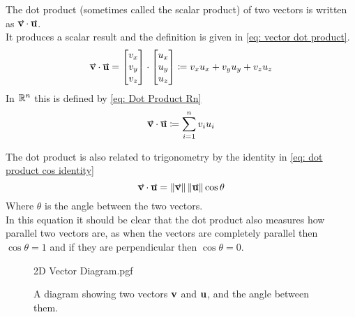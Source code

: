 \documentclass[main.tex]{subfiles}
\begin{document}
                The dot product (sometimes called the scalar product) of two vectors is written as $\vect{v} \cdot \vect{u}$.\\
                It produces a scalar result and the definition is given in \eqref{eq: vector dot product}.
                \begin{equation}
                    \vect{v} \cdot \vect{u} = \Matrix{v_x\\v_y\\v_z} \cdot \Matrix{u_x\\u_y\\u_z} \deq v_x u_x + v_y u_y + v_z u_z
                    \label{eq: vector dot product}
                \end{equation}
                In $\mathbb{R}^n$ this is defined by \eqref{eq: Dot Product Rn}
                \begin{equation}
                    \vect{v} \cdot \vect{u} \deq \sum_{i=1}^n v_i u_i
                    \label{eq: Dot Product Rn}
                \end{equation}

                The dot product is also related to trigonometry by the identity in \eqref{eq: dot product cos identity}
                \begin{equation}
                    \vect{v} \cdot \vect{u} = \vmod{\vect{v}} \vmod{\vect{u}} \cos\theta
                    \label{eq: dot product cos identity}
                \end{equation}
                Where $\theta$ is the angle between the two vectors.\\
                In this equation it should be clear that the dot product also measures how parallel two vectors are, as when the vectors are completely parallel then $\cos\theta = 1$ and if they are perpendicular then $\cos\theta = 0$.

                \begin{figure}[!h]
                    \centering
                    \scalebox{0.7}
                    {
                        \begin{adjustbox}{clip,trim=10mm 5mm 10mm 10mm}
                            {{2D Vector Diagram.pgf}}
                        \end{adjustbox}
                    }
                    \vspace{-8mm}
                    \caption{A diagram showing two vectors $\boldsymbol{\mathbf{v}}$ and $\boldsymbol{\mathbf{u}}$, and the angle between them.}
                    \label{fig: Dot Product Diagram}
                \end{figure}
            
\end{document}
